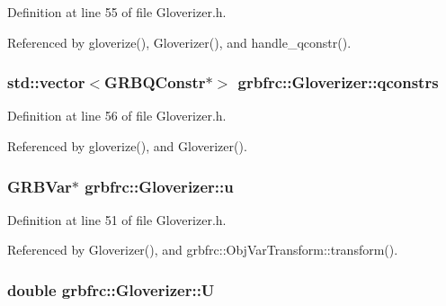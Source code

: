 Definition at line 55 of file Gloverizer.\+h.



Referenced by gloverize(), Gloverizer(), and handle\+\_\+qconstr().

\subsubsection[{\texorpdfstring{qconstrs}{qconstrs}}]{\setlength{\rightskip}{0pt plus 5cm}std\+::vector$<$G\+R\+B\+Q\+Constr$\ast$$>$ grbfrc\+::\+Gloverizer\+::qconstrs\hspace{0.3cm}{\ttfamily [private]}}\hypertarget{classgrbfrc_1_1Gloverizer_a813600069f781a32bd9b859da8a745e3}{}\label{classgrbfrc_1_1Gloverizer_a813600069f781a32bd9b859da8a745e3}


Definition at line 56 of file Gloverizer.\+h.



Referenced by gloverize(), and Gloverizer().

\subsubsection[{\texorpdfstring{u}{u}}]{\setlength{\rightskip}{0pt plus 5cm}G\+R\+B\+Var$\ast$ grbfrc\+::\+Gloverizer\+::u\hspace{0.3cm}{\ttfamily [private]}}\hypertarget{classgrbfrc_1_1Gloverizer_a429340d5fe22f556160b68defb22984b}{}\label{classgrbfrc_1_1Gloverizer_a429340d5fe22f556160b68defb22984b}


Definition at line 51 of file Gloverizer.\+h.



Referenced by Gloverizer(), and grbfrc\+::\+Obj\+Var\+Transform\+::transform().

\subsubsection[{\texorpdfstring{U}{U}}]{\setlength{\rightskip}{0pt plus 5cm}double grbfrc\+::\+Gloverizer\+::U\hspace{0.3cm}{\ttfamily [private]}}\hypertarget{classgrbfrc_1_1Gloverizer_aedcba6ac331133fe4837182ad8e9cca4}{}\label{classgrbfrc_1_1Gloverizer_aedcba6ac331133fe4837182ad8e9cca4}


